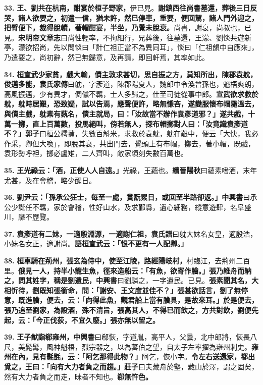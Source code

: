 \textbf{33.} \textbf{王、劉共在杭南，酣宴於桓子野家，}{\footnotesize 伊已見。}\textbf{謝鎮西往尚書墓還，葬後三日反哭，諸人欲要之，初遣一信，猶未許，然已停車，重要，便回駕，諸人門外迎之，把臂便下，裁得脫幘，著帽酣宴，半坐，乃覺未脫衰。}{\footnotesize 尚書，謝裒，尚叔也，已見。\textbf{宋明帝文章志}曰尚性輕率，不拘細行，兄葬後，往墓還，王濛、劉惔共遊新亭，濛欲招尚，先以問惔曰「計仁祖正當不為異同耳」，惔曰「仁祖韻中自應來」，乃遣要之，尚初辭，然已無歸意，及再請，即回軒焉，其率如此。}

\textbf{34.} \textbf{桓宣武少家貧，戲大輸，債主敦求甚切，思自振之方，莫知所出，陳郡袁躭，俊邁多能，}{\footnotesize \textbf{袁氏家傳}曰躭，字彥道，陳郡陽夏人，魏郎中令渙曾孫也，魁梧爽朗，高風振邁，少有異才，倜儻不羈，士人多歸之，仕至司徒從事中郎。}\textbf{宣武欲求救於躭，躭時居艱，恐致疑，試以告焉，應聲便許，略無慊吝，遂變服懷布帽隨溫去，與債主戲，躭素有蓺名，債主就局，曰：「汝故當不辦作袁彥道邪？」遂共戲，十萬一擲，直上百萬數，投馬絕叫，傍若無人，探布帽擲對人曰：「汝竟識袁彥道不？」}{\footnotesize \textbf{郭子}曰桓公樗蒱，失數百斛米，求救於袁躭，躭在艱中，便云「大快，我必作采，卿但大喚」，即脫其衰，共出門去，覺頭上有布帽，擲去，著小帽，既戲，袁形勢呼袒，擲必盧雉，二人齊叫，敵家頃刻失數百萬也。}

\textbf{35.} \textbf{王光祿云：「酒，正使人人自遠。」}{\footnotesize 光祿，王蘊也。\textbf{續晉陽秋}曰蘊素嗜酒，末年尤甚，及在會稽，略少醒日。}

\textbf{36.} \textbf{劉尹云：「孫承公狂士，每至一處，賞翫累日，或回至半路卻返。」}{\footnotesize \textbf{中興書}曰承公少誕任不羈，家於會稽，性好山水，及求鄞縣，遺心細務，縱意遊肆，名阜盛川，靡不歷覽。}

\textbf{37.} \textbf{袁彥道有二妹，一適殷淵源，一適謝仁祖，}{\footnotesize \textbf{袁氏譜}曰躭大妹名女皇，適殷浩，小妹名女正，適謝尚。}\textbf{語桓宣武云：「恨不更有一人配卿。」}

\textbf{38.} \textbf{桓車騎在荊州，張玄為侍中，使至江陵，路經陽岐村，}{\footnotesize 村臨江，去荊州二百里。}\textbf{俄見一人，持半小籠生魚，徑來造船云：「有魚，欲寄作膾。」張乃維舟而納之，問其姓字，稱是劉遺民，}{\footnotesize \textbf{中興書}曰劉驎之，一字遺民。已見。}\textbf{張素聞其名，大相忻待，劉既知張銜命，問：「謝安、王文度並佳不？」張甚欲話言，劉了無停意，既進膾，便去，云：「向得此魚，觀君船上當有膾具，是故來耳。」於是便去，張乃追至劉家，為設酒，殊不清旨，張高其人，不得已而飲之，方共對飲，劉便先起，云：「今正伐荻，不宜久廢。」張亦無以留之。}

\textbf{39.} \textbf{王子猷詣郗雍州，}{\footnotesize \textbf{中興書}曰郗恢，字道胤，高平人，父曇，北中郎將，恢長八尺，美髭髯，風神魁梧，烈宗器之，以為蕃伯之望，自太子左率擢為雍州刺史。}\textbf{雍州在內，見有毾㲪，云：「阿乞那得此物？」}{\footnotesize 阿乞，恢小字。}\textbf{令左右送還家，郗出覓之，王曰：「向有大力者負之而趨。」}{\footnotesize \textbf{莊子}曰夫藏舟於壑，藏山於澤，謂之固矣，然有大力者負之而走，昧者不知也。}\textbf{郗無忤色。}

